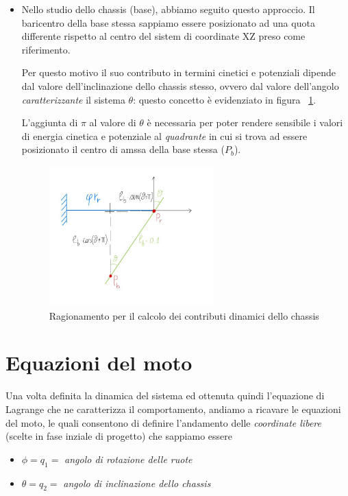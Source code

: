 \begin{itemize}
 	\item Nello studio dello chassis (base), abbiamo seguito questo approccio. Il baricentro della base stessa sappiamo essere posizionato ad una quota differente rispetto al centro del sistem di coordinate XZ preso come riferimento.
 	
 	Per questo motivo il suo contributo in termini cinetici e potenziali dipende dal valore dell'inclinazione dello chassis stesso, ovvero dal valore dell'angolo \textit{caratterizzante} il sistema $\theta$: questo concetto è evidenziato in figura ~\ref{fig:chassis}.
 	
 	L'aggiunta di \textit{$\pi$} al valore di $\theta$ è necessaria per poter rendere sensibile i valori di energia cinetica e potenziale al \textit{quadrante} in cui si trova ad essere posizionato il centro di amssa della base stessa ($P_b$).
 	
 	\begin{figure}[h]
 		\centering   	
 		\includegraphics[width=0.6\textwidth]{Immagini/ChassisAngle.jpg}
 		\caption{Ragionamento per il calcolo dei contributi dinamici dello chassis}
 		\label{fig:chassis}
 	\end{figure}
 	
\end{itemize}

\chapter{Equazioni del moto}
Una volta definita la dinamica del sistema ed ottenuta quindi l'equazione di Lagrange che ne caratterizza il comportamento, andiamo a ricavare le equazioni del moto, le quali consentono di definire l'andamento delle \textit{coordinate libere} (scelte in fase inziale di progetto) che sappiamo essere
\begin{itemize}
	\item $\phi = q_1 =$ \textit{angolo di rotazione delle ruote}
	\item $\theta = q_2 =$ \textit{angolo di inclinazione dello chassis}
\end{itemize}


